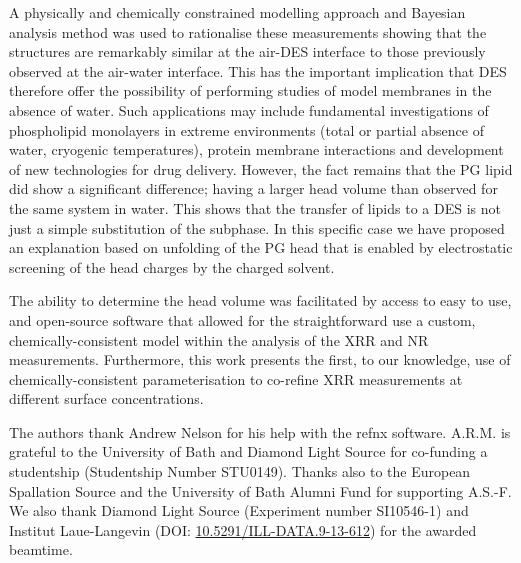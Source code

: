 \documentclass[%
 reprint,
 amsmath,amssymb,
 prl,
]{revtex4-1}
\begin{document}
A physically and chemically constrained modelling approach and Bayesian analysis method was used to rationalise these measurements showing that the structures are remarkably similar at the air-DES interface to those previously observed at the air-water interface.
This has the important implication that DES therefore offer the possibility of performing studies of model membranes in the absence of water.
Such applications may include fundamental investigations of phospholipid monolayers in extreme environments (total or partial absence of water, cryogenic temperatures), protein membrane interactions and development of new technologies for drug delivery.
However, the fact remains that the PG lipid did show a significant difference; having a larger head volume than observed for the same system in water.
This shows that the transfer of lipids to a DES is not just a simple substitution of the subphase. In this specific case we have proposed an explanation based on unfolding of the PG head that is enabled by electrostatic screening of the head charges by the charged solvent.

The ability to determine the head volume was facilitated by access to easy to use, and open-source software that allowed for the straightforward use a custom, chemically-consistent model within the analysis of the XRR and NR measurements.
Furthermore, this work presents the first, to our knowledge, use of chemically-consistent parameterisation to co-refine XRR measurements at different surface concentrations.

\begin{acknowledgments}
The authors thank Andrew Nelson for his help with the refnx software.
A.R.M. is grateful to the University of Bath and Diamond Light Source for co-funding a studentship (Studentship Number STU0149).
Thanks also to the European Spallation Source and the University of Bath Alumni Fund for supporting A.S.-F.
We also thank Diamond Light Source (Experiment number SI10546-1) and Institut Laue-Langevin (DOI: \href{http://doi.org/10.5291/ILL-DATA.9-13-612}{10.5291/ILL-DATA.9-13-612}) for the awarded beamtime.
\end{acknowledgments}

\end{document}
